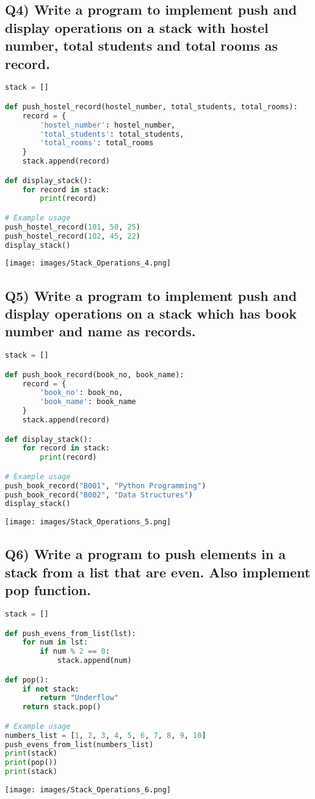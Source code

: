 \documentclass{article}
\begin{document}
\subsection*{Q4) Write a program to implement push and display operations on a stack with hostel number, total students and total rooms as record.}
\begin{lstlisting}[language=Python]
stack = []

def push_hostel_record(hostel_number, total_students, total_rooms):
    record = {
        'hostel_number': hostel_number,
        'total_students': total_students,
        'total_rooms': total_rooms
    }
    stack.append(record)

def display_stack():
    for record in stack:
        print(record)

# Example usage
push_hostel_record(101, 50, 25)
push_hostel_record(102, 45, 22)
display_stack()
\end{lstlisting}
\texttt{[image: images/Stack\_Operations\_4.png]}

\subsection*{Q5) Write a program to implement push and display operations on a stack which has book number and name as records.}
\begin{lstlisting}[language=Python]
stack = []

def push_book_record(book_no, book_name):
    record = {
        'book_no': book_no,
        'book_name': book_name
    }
    stack.append(record)

def display_stack():
    for record in stack:
        print(record)

# Example usage
push_book_record("B001", "Python Programming")
push_book_record("B002", "Data Structures")
display_stack()
\end{lstlisting}
\texttt{[image: images/Stack\_Operations\_5.png]}

\subsection*{Q6) Write a program to push elements in a stack from a list that are even. Also implement pop function.}
\begin{lstlisting}[language=Python]
stack = []

def push_evens_from_list(lst):
    for num in lst:
        if num % 2 == 0:
            stack.append(num)

def pop():
    if not stack:
        return "Underflow"
    return stack.pop()

# Example usage
numbers_list = [1, 2, 3, 4, 5, 6, 7, 8, 9, 10]
push_evens_from_list(numbers_list)
print(stack)
print(pop())
print(stack)
\end{lstlisting}
\texttt{[image: images/Stack\_Operations\_6.png]}
\end{document}
